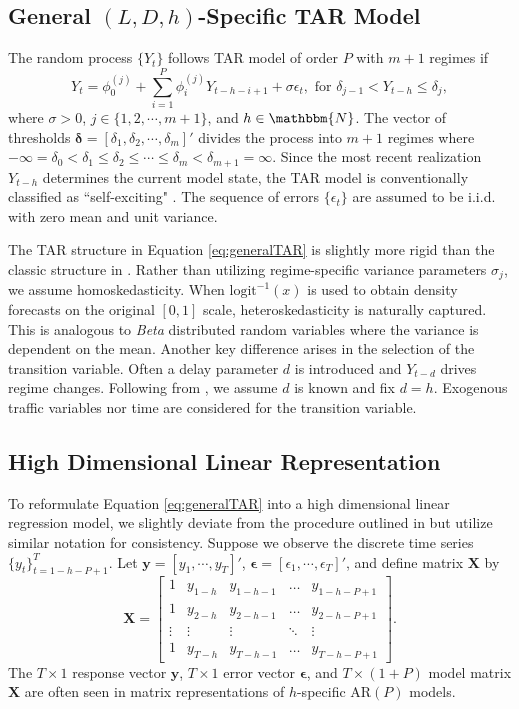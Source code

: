 \subsection{General $(L,D,h)$-Specific TAR Model}
The random process $\{Y_t\}$ follows TAR model of order $P$ with $m+1$ regimes if 
\begin{equation}
\label{eq:generalTAR}
Y_{t}=\phi_0^{(j)}+\sum\limits_{i=1}^P \phi^{(j)}_i Y_{t-h-i+1}+\sigma\epsilon_{t}, \textrm{ for } \delta_{j-1}<Y_{t-h}\leq \delta_{j},
\end{equation}
where $\sigma>0$, $j\in\{1,2,\cdots,m+1\}$, and $h \in \mathbbm{N}$. The vector of thresholds $\bm{\delta}=[\delta_1,\delta_2,\cdots,\delta_m]'$ divides the process into $m+1$ regimes where $-\infty=\delta_0<\delta_1\leq\delta_2\leq \cdots \leq \delta_m<\delta_{m+1}=\infty$. Since the most recent realization $Y_{t-h}$ determines the current model state, the TAR model is conventionally classified as ``self-exciting" \citep{Ghaddar1981}. The sequence of errors $\{\epsilon_t\}$ are assumed to be i.i.d. with zero mean and unit variance.

The TAR structure in Equation \ref{eq:generalTAR} is slightly more rigid than the classic structure in \cite{Chen1995}. Rather than utilizing regime-specific variance parameters $\sigma_j$, we assume homoskedasticity. When $\textrm{logit}^{-1}(x)$ is used to obtain density forecasts on the original $[0,1]$ scale, heteroskedasticity is naturally captured. This is analogous to \textit{Beta} distributed random variables where the variance is dependent on the mean. Another key difference arises in the selection of the transition variable. Often a delay parameter $d$ is introduced and $Y_{t-d}$ drives regime changes. Following from \cite{Chan2015}, we assume $d$ is known and fix $d=h$. Exogenous traffic variables nor time are considered for the transition variable.

\subsection{High Dimensional Linear Representation}
To reformulate Equation \ref{eq:generalTAR} into a high dimensional linear regression model, we slightly deviate from the procedure outlined in \cite{Chan2015,Chan2017} but utilize similar notation for consistency. Suppose we observe the discrete time series $\{y_t\}_{t=1-h-P+1}^T$. Let $\bm{y}=[y_{1},\cdots,y_{T}]'$, $\bm{\epsilon}=[\epsilon_{1},\cdots,\epsilon_{T}]'$, and define matrix $\bm{X}$ by
$$
\bm{X}=\begin{bmatrix}
    1 & y_{1-h} & y_{1-h-1} & \dots  & y_{1-h-P+1} \\
    1 & y_{2-h} & y_{2-h-1} & \dots  & y_{2-h-P+1} \\
    \vdots & \vdots & \vdots & \ddots & \vdots \\
    1 & y_{T-h} & y_{T-h-1} & \dots  & y_{T-h-P+1}
\end{bmatrix}.
$$
The $T\times 1$ response vector $\bm{y}$, $T\times 1$ error vector $\bm{\epsilon}$, and  $T \times (1+P)$ model matrix $\bm{X}$ are often seen in matrix representations of $h$-specific AR$(P)$ models.

